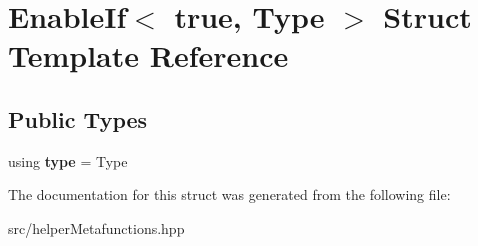 \hypertarget{structEnableIf_3_01true_00_01Type_01_4}{}\section{Enable\+If$<$ true, Type $>$ Struct Template Reference}
\label{structEnableIf_3_01true_00_01Type_01_4}
\subsection*{Public Types}
\begin{DoxyCompactItemize}
\item 
\mbox{\label{structEnableIf_3_01true_00_01Type_01_4_a08a4f34283ad974d1fe6f77a5c68b04f}} 
using {\bfseries type} = Type
\end{DoxyCompactItemize}


The documentation for this struct was generated from the following file\+:\begin{DoxyCompactItemize}
\item 
src/helper\+Metafunctions.\+hpp\end{DoxyCompactItemize}
